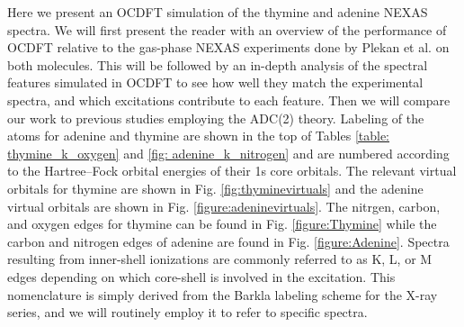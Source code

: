 \documentclass[8.5pt,twoside,twocolumn]{article}
\begin{document}
Here we present an OCDFT simulation of the thymine and adenine NEXAS spectra. We will first present the reader with an overview of the performance of OCDFT relative to the gas-phase NEXAS experiments done by Plekan et al. \cite{plekan_theoretical_2008} on both molecules. This will be followed by an in-depth analysis of the spectral features simulated in OCDFT to see how well they match the experimental spectra, and which excitations contribute to each feature. Then we will compare our work to previous studies employing the ADC(2) theory. Labeling of the atoms for adenine and thymine are shown in the top of Tables \ref{table: thymine_k_oxygen} and \ref{fig: adenine_k_nitrogen} and are numbered according to the Hartree--Fock orbital energies of their 1s core orbitals. The relevant virtual orbitals  for thymine are shown in Fig. \ref{fig:thyminevirtuals} and the adenine virtual orbitals are shown in Fig. \ref{figure:adeninevirtuals}.  The nitrgen, carbon, and oxygen edges for thymine can be found in Fig. \ref{figure:Thymine} while the carbon and nitrogen edges of adenine are found in Fig. \ref{figure:Adenine}. Spectra resulting from inner-shell ionizations are commonly referred to as K, L, or M edges depending on which core-shell is involved in the excitation. This nomenclature is simply derived from the Barkla labeling scheme for the X-ray series, and we will routinely employ it to refer to specific spectra.
\end{document}
